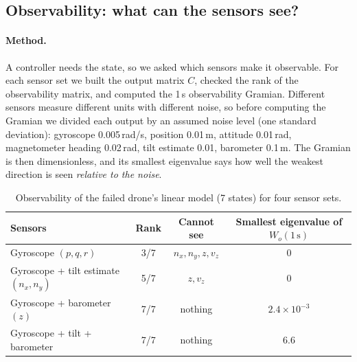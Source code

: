 \subsection{Observability: what can the sensors see?}
\paragraph{Method.} A controller needs the state, so we asked which sensors make it observable. For each sensor set we built the output matrix $C$, checked the rank of the observability matrix, and computed the 1\,s observability Gramian. Different sensors measure different units with different noise, so before computing the Gramian we divided each output by an assumed noise level (one standard deviation): gyroscope 0.005\,rad/s, position 0.01\,m, attitude 0.01\,rad, magnetometer heading 0.02\,rad, tilt estimate 0.01, barometer 0.1\,m. The Gramian is then dimensionless, and its smallest eigenvalue says how well the weakest direction is seen \emph{relative to the noise}.

\begin{table}[h]
\centering\small
\caption{Observability of the failed drone's linear model (7 states) for four sensor sets.}\label{tab:obs}
\begin{tabular}{lccc}
\toprule
Sensors & Rank & Cannot see & Smallest eigenvalue of $W_o(1\,\mathrm{s})$ \\
\midrule
Gyroscope $(p,q,r)$ & 3/7 & $n_x, n_y, z, v_z$ & 0 \\
Gyroscope + tilt estimate $(n_x, n_y)$ & 5/7 & $z, v_z$ & 0 \\
Gyroscope + barometer $(z)$ & 7/7 & nothing & $2.4\times10^{-3}$ \\
Gyroscope + tilt + barometer & 7/7 & nothing & 6.6 \\
\bottomrule
\end{tabular}
\end{table}


